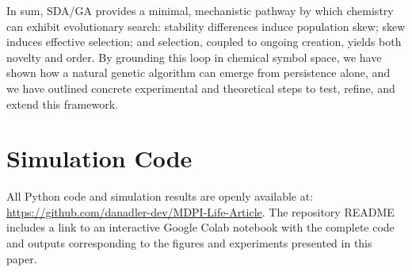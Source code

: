 \documentclass[life,article,submit,pdftex,moreauthors]{Definitions/mdpi}
\begin{document}
In sum, SDA/GA provides a minimal, mechanistic pathway by which chemistry can exhibit evolutionary search: stability differences induce population skew; skew induces effective selection; and selection, coupled to ongoing creation, yields both novelty and order. By grounding this loop in chemical symbol space, we have shown how a natural genetic algorithm can emerge from persistence alone, and we have outlined concrete experimental and theoretical steps to test, refine, and extend this framework.

\section{Simulation Code}

All Python code and simulation results are openly available at:
\url{https://github.com/danadler-dev/MDPI-Life-Article}. 
The repository README includes a link to an interactive Google Colab notebook  with the complete code and outputs corresponding to the figures and experiments presented in this paper.
\end{document}
